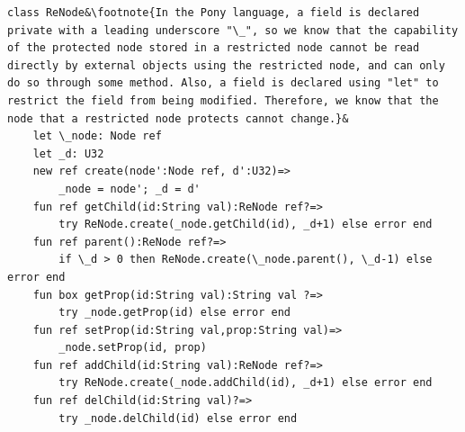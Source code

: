 \documentclass[a4paper,11pt,twoside]{article}
\begin{document}
\begin{lstlisting}
class ReNode&\footnote{In the Pony language, a field is declared private with a leading underscore "\_", so we know that the capability of the protected node stored in a restricted node cannot be read directly by external objects using the restricted node, and can only do so through some method. Also, a field is declared using "let" to restrict the field from being modified. Therefore, we know that the node that a restricted node protects cannot change.}&
    let \_node: Node ref
    let _d: U32
    new ref create(node':Node ref, d':U32)=>
        _node = node'; _d = d'
    fun ref getChild(id:String val):ReNode ref?=>
        try ReNode.create(_node.getChild(id), _d+1) else error end
    fun ref parent():ReNode ref?=>
        if \_d > 0 then ReNode.create(\_node.parent(), \_d-1) else error end
    fun box getProp(id:String val):String val ?=>
        try _node.getProp(id) else error end
    fun ref setProp(id:String val,prop:String val)=>
        _node.setProp(id, prop)
    fun ref addChild(id:String val):ReNode ref?=>
        try ReNode.create(_node.addChild(id), _d+1) else error end
    fun ref delChild(id:String val)?=>
        try _node.delChild(id) else error end
\end{lstlisting}
\end{document}
